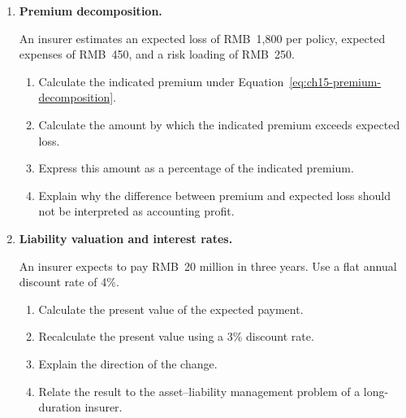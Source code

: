 \begin{enumerate}
\begin{enumerate}
\item Calculate the insured's retained loss in each case.

\item Explain how the deductible affects policyholder incentives relative to full reimbursement from the first renminbi of loss.

\end{enumerate}

\item \textbf{Premium decomposition.}

An insurer estimates an expected loss of RMB~1,800 per policy, expected expenses of RMB~450, and a risk loading of RMB~250.

\begin{enumerate}

\item Calculate the indicated premium under Equation~\ref{eq:ch15-premium-decomposition}.

\item Calculate the amount by which the indicated premium exceeds expected loss.

\item Express this amount as a percentage of the indicated premium.

\item Explain why the difference between premium and expected loss should not be interpreted as accounting profit.

\end{enumerate}

\item \textbf{Liability valuation and interest rates.}

An insurer expects to pay RMB~20 million in three years. Use a flat annual discount rate of 4\%.

\begin{enumerate}

\item Calculate the present value of the expected payment.

\item Recalculate the present value using a 3\% discount rate.

\item Explain the direction of the change.

\item Relate the result to the asset--liability management problem of a long-duration insurer.

\end{enumerate}


\end{enumerate}

